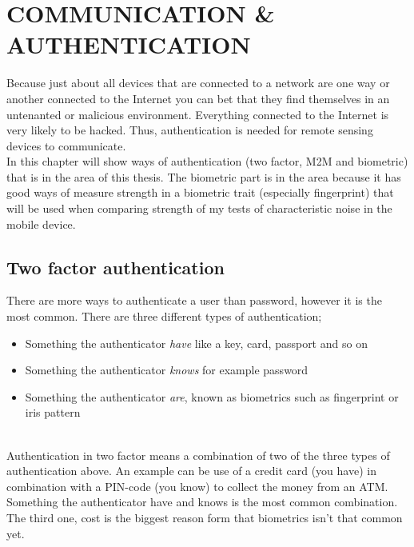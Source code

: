 \chapter{COMMUNICATION \& AUTHENTICATION}\label{cha:auth} 
Because just about all devices that are connected to a network are one way or another connected to the Internet you can bet that they find themselves in an untenanted or malicious environment. Everything connected to the Internet is very likely to be hacked. Thus, authentication is needed for remote sensing devices to communicate. \cite[]{auth:M2Mcom}\\
In this chapter will show ways of authentication (two factor, M2M and biometric) that is in the area of this thesis. The biometric part is in the area because it has good ways of measure strength in a biometric trait (especially fingerprint) that will be used when comparing strength of my tests of characteristic noise in the mobile device.

\section{Two factor authentication}\label{sec:2fauth} 
There are more ways to authenticate a user than password, however it is the most common. There are three different types of authentication; 
\begin{itemize}
	\item Something the authenticator \textit{have} like a key, card, passport and so on
	\item Something the authenticator \textit{knows} for example password
	\item Something the authenticator \textit{are}, known as biometrics such as fingerprint or iris pattern
\end{itemize}
\cite[p.~31]{rosssec} \\
Authentication in two factor means a combination of two of the three types of authentication above. An example can be use of a credit card (you have) in combination with a PIN-code (you know) to collect the money from an ATM. Something the authenticator have and knows is the most common combination. The third one, cost is the biggest reason form that biometrics isn't that common yet.
\cite[p.~47]{rosssec}

